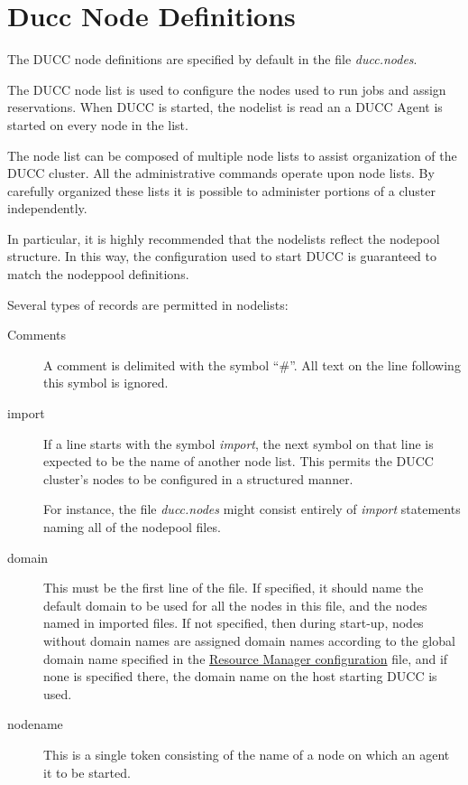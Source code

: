 \section{Ducc Node Definitions}
\label{sec:admin-ducc.nodes}
    The DUCC node definitions are specified by default in the file {\em ducc.nodes}.

    The DUCC node list is used to configure the nodes used to run jobs and assign reservations. 
    When DUCC is started, the nodelist is read an a DUCC Agent is started on every node in the list.

    The node list can be composed of multiple node lists to assist organization of the DUCC cluster. 
    All the administrative commands operate upon node lists. By carefully organized these lists it is 
    possible to administer portions of a cluster independently. 

    In particular, it is highly recommended that the nodelists reflect the nodepool structure.  In
    this way, the configuration used to start DUCC is guaranteed to match the nodeppool definitions.

    Several types of records are permitted in nodelists:
    \begin{description}

      \item[Comments] A comment is delimited with the symbol ``$\#$''.  All text on the line
        following this symbol is ignored.

      \item[import] If a line starts with the symbol {\em import}, the next symbol on that line
        is expected to be the name of another node list.  This permits the DUCC cluster's
        nodes to be configured in a structured manner.

        For instance, the file {\em ducc.nodes} might consist entirely of {\em import} statements
        naming all of the nodepool files.
      \item[domain] This must be the first line of the file.  If specified, it should name
        the default domain to be used for all the nodes in this file, and the nodes named
        in imported files.  If not specified, then during start-up, nodes without domain names are assigned
        domain names according to the global domain name specified in the \hyperref[subsubsec:nodepool.configuration]{Resource Manager configuration}
        file, and if none is specified there, the domain name on the host starting DUCC is used.

      \item[nodename] This is a single token consisting of the name of a node on which an
        agent it to be started.

    \end{description}


